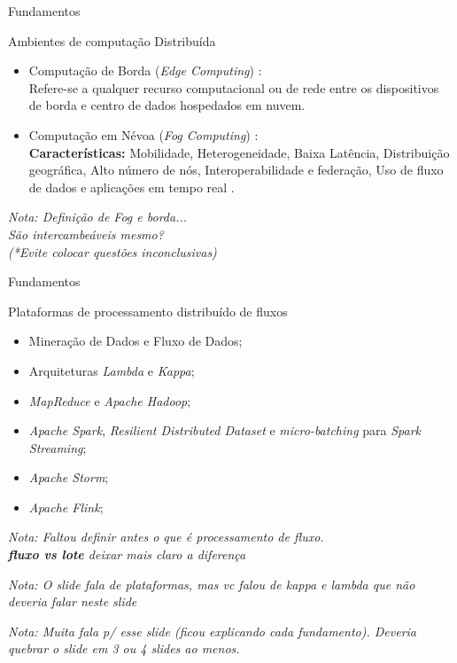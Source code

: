 \documentclass[aspectratio=43,10pt]{beamer}
\newcommand{\nota}[1]{\hspace*{-0.5cm}\textit{{\color[rgb]{1,0,0}Nota: #1}}}
\begin{document}
{%
\begin{frame}[fragile]{Fundamentos}
  \begin{alertblock}{Ambientes de computação Distribuída}
  \begin{itemize}
    
  \item Computação de Borda (\emph{Edge Computing}) \cite{Shi2016}:
  \\ Refere-se a qualquer recurso computacional ou de rede entre os dispositivos
  de borda e centro de dados hospedados em nuvem.
  
  \item Computação em Névoa (\emph{Fog Computing}) \cite{Bonomi2012,dastjerdi2016}:
  \\ \textbf{Características:}
  Mobilidade,
  Heterogeneidade,
  Baixa Latência,
  Distribuição geográfica,
  Alto número de nós,
  Interoperabilidade e federação,
  Uso de fluxo de dados e aplicações em tempo real
  \cite{IEEECommunicationsSociety2018}.
\end{itemize}
\end{alertblock}
\nota{Definição de Fog e borda...\\
São intercambeáveis mesmo?\\
(*Evite colocar questões inconclusivas)}
\end{frame}
}


\begin{frame}[fragile]{Fundamentos}
\begin{alertblock}{Plataformas de processamento distribuído de fluxos}
  \begin{itemize}
    \item Mineração de Dados e Fluxo de Dados;
    \item Arquiteturas \emph{Lambda} e \emph{Kappa};
    \item \emph{MapReduce} e \emph{Apache Hadoop};
    \item \emph{Apache Spark}, \emph{Resilient Distributed Dataset} e
    \emph{micro-batching} para \emph{Spark Streaming};
    \item \emph{Apache Storm};
    \item \emph{Apache Flink};
  \end{itemize}
\end{alertblock}
\nota{Faltou definir antes o que é processamento de fluxo.\\
\textbf{fluxo vs lote} deixar mais claro a diferença}

\nota{O slide fala de plataformas, mas vc falou de kappa e lambda
que não deveria falar neste slide}

\nota{Muita fala p/ esse slide (ficou explicando cada fundamento).
Deveria quebrar o slide em 3 ou 4 slides ao menos.}
\end{frame}
\end{document}
